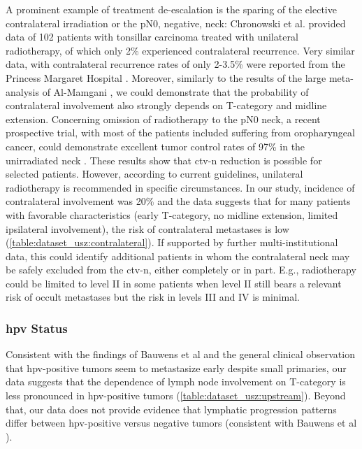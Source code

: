 \documentclass[\relativeRoot/main.tex]{subfiles}
\begin{document}
A prominent example of treatment de-escalation is the sparing of the elective contralateral irradiation or the pN0, negative, neck: Chronowski et al. \cite{chronowski_unilateral_2012} provided data of 102 patients with tonsillar carcinoma treated with unilateral radiotherapy, of which only 2\% experienced contralateral recurrence. Very similar data, with contralateral recurrence rates of only 2-3.5\% were reported from the Princess Margaret Hospital \cite{huang_re-evaluation_2017-1,osullivan_benefits_2001}. Moreover, similarly to the results of the large meta-analysis of Al-Mamgani \cite{al-mamgani_contralateral_2017}, we could demonstrate that the probability of contralateral involvement also strongly depends on T-category and midline extension. Concerning omission of radiotherapy to the pN0 neck, a recent prospective trial, with most of the patients included suffering from oropharyngeal cancer, could demonstrate excellent tumor control rates of 97\% in the unirradiated neck \cite{contreras_eliminating_2019}. These results show that \gls{ctv-n} reduction is possible for selected patients. However, according to current guidelines, unilateral radiotherapy is recommended in specific circumstances. In our study, incidence of contralateral involvement was 20\% and the data suggests that for many patients with favorable characteristics (early T-category, no midline extension, limited ipsilateral involvement), the risk of contralateral metastases is low (\cref{table:dataset_usz:contralateral}). If supported by further multi-institutional data, this could identify additional patients in whom the contralateral neck may be safely excluded from the \gls{ctv-n}, either completely or in part. E.g., radiotherapy could be limited to level II in some patients when level II still bears a relevant risk of occult metastases but the risk in levels III and IV is minimal.

\subsubsection*{\Gls{hpv} Status}

Consistent with the findings of Bauwens et al \cite{bauwens_prevalence_2021} and the general clinical observation that \gls{hpv}-positive tumors seem to metastasize early despite small primaries, our data suggests that the dependence of lymph node involvement on T-category is less pronounced in \gls{hpv}-positive tumors (\cref{table:dataset_usz:upstream}). Beyond that, our data does not provide evidence that lymphatic progression patterns differ between \gls{hpv}-positive versus negative tumors (consistent with Bauwens et al \cite{bauwens_prevalence_2021}).
\end{document}
